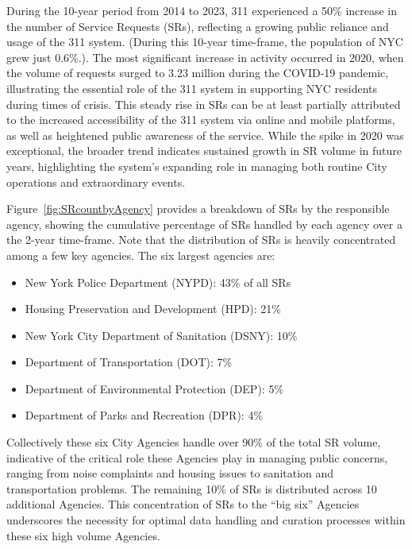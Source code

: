 \documentclass[linenumber]{jdsart}
\begin{document}
During the 10\mbox{-}year period from 2014 to 2023,  311 experienced
a 50\% increase in the number of Service Requests (SRs), 
reflecting a growing public reliance and usage of 
the 311 system. (During this 10\mbox{-}year time-frame, the 
population of NYC grew just 0.6\%.). The most significant increase
in activity occurred in 2020, when the volume of requests 
surged to 3.23 million during the COVID\mbox{-}19 pandemic, 
illustrating the essential role of the 311 system in supporting 
NYC residents during times of crisis. This steady 
rise in SRs can be at least partially attributed to the increased 
accessibility of the 311 system via online and mobile 
platforms, as well as heightened public awareness of the service. 
While the spike in 2020 was exceptional, the broader trend 
indicates sustained growth in SR volume in future years,  
highlighting the system's expanding role in managing 
both routine City operations and extraordinary events.

Figure~\ref{fig:SRcountbyAgency} provides a breakdown of SRs by
the responsible agency, showing the cumulative 
percentage of SRs handled by each
agency over a the 2\mbox{-}year time-frame. Note that the
distribution of SRs is heavily concentrated among a few key 
agencies. The six largest agencies are:

\begin{itemize}[left=1.5em]
    \item New York Police Department (NYPD): 43\% of all SRs
    \item Housing Preservation and Development (HPD): 21\%
    \item New York City Department of Sanitation (DSNY): 10\%
    \item Department of Transportation (DOT): 7\%
    \item Department of Environmental Protection (DEP): 5\%
    \item Department of Parks and Recreation (DPR): 4\%
\end{itemize}

Collectively these six City Agencies handle over 90\% of the total SR 
volume, indicative of the critical role these Agencies play in managing
public concerns, ranging from noise complaints and housing issues to
sanitation and transportation problems. The remaining
10\% of SRs is distributed across 10 additional Agencies. 
This concentration of SRs to the ``big six'' Agencies 
underscores the necessity for optimal data handling and 
curation processes within these six high volume Agencies.
\end{document}
